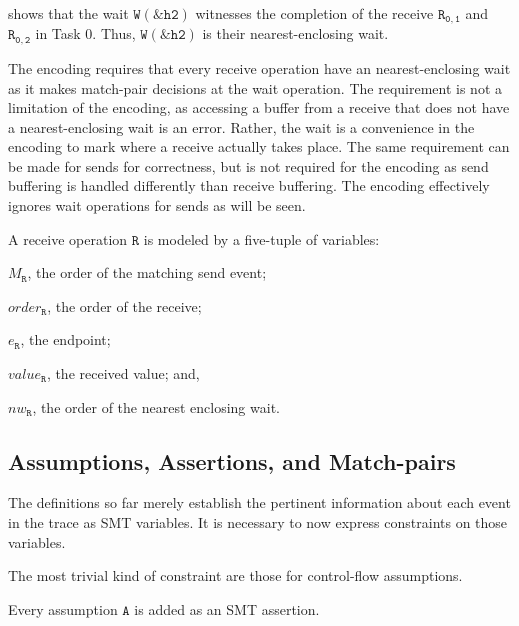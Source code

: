  shows that the wait $\mathtt{W{(\&h2)}}$
witnesses the completion of the receive $\mathtt{R_{0,1}}$ and
$\mathtt{R_{0,2}}$ in Task 0. Thus, $\mathtt{W{(\&h2)}}$ is their
nearest-enclosing wait.

The encoding requires that every receive operation have an
nearest-enclosing wait as it makes match-pair decisions at the wait
operation. The requirement is not a limitation of the encoding, as
accessing a buffer from a receive that does not have a
nearest-enclosing wait is an error. Rather, the wait is a convenience
in the encoding to mark where a receive actually takes place. The same
requirement can be made for sends for correctness, but is not required
for the encoding as send buffering is handled differently than receive
buffering.  The encoding effectively ignores wait operations for sends
as will be seen.

\begin{definition}[Receive] \label{def:rcv}
A receive operation $\mathtt{R}$ is modeled by a five-tuple of variables:
\begin{compactenum}
\item $M_\mathtt{R}$, the order of the matching send event;

\item $\mathit{order}_\mathtt{R}$, the order of the receive;

\item $e_\mathtt{R}$, the endpoint;

\item $\mathit{value}_\mathtt{R}$, the received value; and,

\item $\mathit{nw}_\mathtt{R}$, the order of the nearest enclosing wait.
\end{compactenum}
\end{definition}

\subsection{Assumptions, Assertions, and Match-pairs}

The definitions so far merely establish the pertinent information
about each event in the trace as SMT variables. It is necessary to now express
constraints on those variables.

The most trivial kind of constraint are those for control-flow
assumptions.

\begin{definition}[Assumption] \label{def:assm}
Every assumption $\mathtt{A}$ is added as an SMT assertion.
\end{definition}

